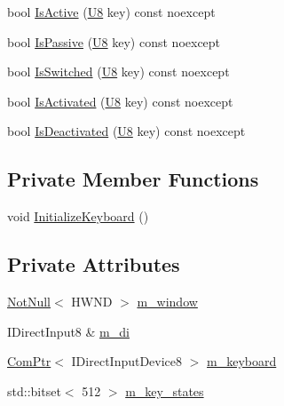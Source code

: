 \begin{DoxyCompactItemize}
\item 
bool \mbox{\hyperlink{classmage_1_1input_1_1_keyboard_a89d22e870c94d01d5338e2e9e6cf5f46}{Is\+Active}} (\mbox{\hyperlink{namespacemage_a30677c03d683c4c35630c25f6ff3fb7f}{U8}} key) const noexcept
\item 
bool \mbox{\hyperlink{classmage_1_1input_1_1_keyboard_a4bbd5f7db6d2cb7123e74edd05363dba}{Is\+Passive}} (\mbox{\hyperlink{namespacemage_a30677c03d683c4c35630c25f6ff3fb7f}{U8}} key) const noexcept
\item 
bool \mbox{\hyperlink{classmage_1_1input_1_1_keyboard_ac6d4bcf6d8f363a74b684303aa8c5993}{Is\+Switched}} (\mbox{\hyperlink{namespacemage_a30677c03d683c4c35630c25f6ff3fb7f}{U8}} key) const noexcept
\item 
bool \mbox{\hyperlink{classmage_1_1input_1_1_keyboard_a0afe5b5fde182d771817272deb8ae1fc}{Is\+Activated}} (\mbox{\hyperlink{namespacemage_a30677c03d683c4c35630c25f6ff3fb7f}{U8}} key) const noexcept
\item 
bool \mbox{\hyperlink{classmage_1_1input_1_1_keyboard_ac3a66b65cabf50a07ba78847e5860ece}{Is\+Deactivated}} (\mbox{\hyperlink{namespacemage_a30677c03d683c4c35630c25f6ff3fb7f}{U8}} key) const noexcept
\end{DoxyCompactItemize}
\subsection*{Private Member Functions}
\begin{DoxyCompactItemize}
\item 
void \mbox{\hyperlink{classmage_1_1input_1_1_keyboard_a9a764a44144ee846bc5fa8094fa591e2}{Initialize\+Keyboard}} ()
\end{DoxyCompactItemize}
\subsection*{Private Attributes}
\begin{DoxyCompactItemize}
\item 
\mbox{\hyperlink{namespacemage_a8769f9d670d6b585ea306cb1062af94b}{Not\+Null}}$<$ H\+W\+ND $>$ \mbox{\hyperlink{classmage_1_1input_1_1_keyboard_ac8074d4690146bf6523c236a7af50353}{m\+\_\+window}}
\item 
I\+Direct\+Input8 \& \mbox{\hyperlink{classmage_1_1input_1_1_keyboard_a3757173fa08e6744d374e0a5397de11c}{m\+\_\+di}}
\item 
\mbox{\hyperlink{namespacemage_ae74f374780900893caa5555d1031fd79}{Com\+Ptr}}$<$ I\+Direct\+Input\+Device8 $>$ \mbox{\hyperlink{classmage_1_1input_1_1_keyboard_ad6993f7c9fc9692708c1f928d0ea1e6b}{m\+\_\+keyboard}}
\item 
std\+::bitset$<$ 512 $>$ \mbox{\hyperlink{classmage_1_1input_1_1_keyboard_ad5b0ec6ca8ff1adbfed19c2382fa8a65}{m\+\_\+key\+\_\+states}}
\end{DoxyCompactItemize}


